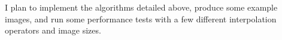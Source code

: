 I plan to implement the algorithms detailed above, produce some example images, and run some performance tests with a few different interpolation operators and image sizes.